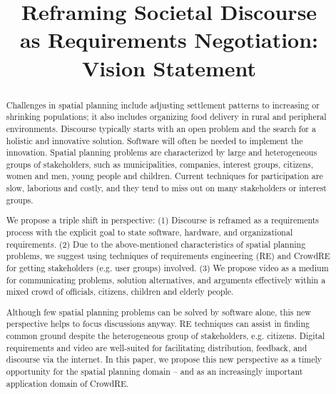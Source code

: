 \documentclass[conference]{IEEEtran}
\begin{document}
\title{Reframing Societal Discourse \\as Requirements Negotiation: \\ Vision 
Statement}

\author{
	}

\maketitle

\begin{abstract}
Challenges in spatial planning include adjusting settlement patterns to 
increasing or shrinking populations; it also includes organizing food delivery 
in rural and peripheral environments. Discourse typically starts with an open 
problem and the search for a holistic and innovative solution. Software will 
often be needed to implement the innovation. Spatial planning problems are 
characterized by large and heterogeneous groups of stakeholders, such as 
municipalities, companies, interest groups, citizens, women and men, young 
people and children. Current techniques for participation are slow, laborious 
and costly, and they tend to miss out on many stakeholders or interest groups.

We propose a triple shift in perspective: (1) Discourse is reframed as a 
requirements process with the explicit goal to state software, hardware, and 
organizational requirements. (2) Due to the above-mentioned characteristics of 
spatial planning problems, we suggest using techniques of requirements 
engineering (RE) and CrowdRE for getting stakeholders (e.g. user groups) 
involved. (3) We propose video as a medium for communicating problems, 
solution alternatives, and arguments effectively within a mixed crowd of 
officials, citizens, children and elderly people.

Although few spatial planning problems can be solved by software alone, this 
new perspective helps to focus discussions anyway. RE techniques can assist in 
finding common ground despite the heterogeneous group of stakeholders, e.g. 
citizens. Digital requirements and video are well-suited for facilitating 
distribution, feedback, and discourse via the internet. In this paper, we 
propose this new perspective as a timely opportunity for the spatial planning 
domain -- and as an increasingly important application domain of CrowdRE.

\end{abstract}
\end{document}
